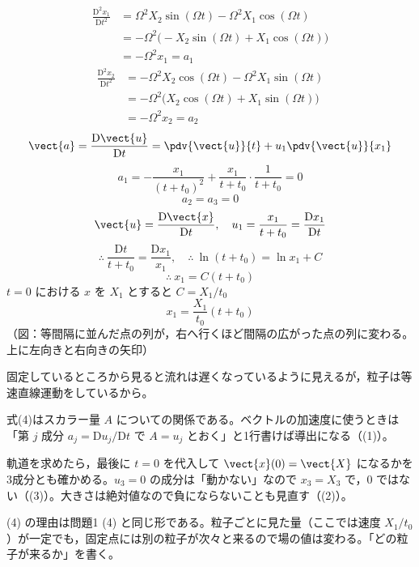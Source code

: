 \begin{align*}
\frac{\mathrm{D}^{2}x_{1}}{\mathrm{D}t^{2}}&=\Omega^{2}X_{2}\sin(\Omega t)-\Omega^{2}X_{1}\cos(\Omega t)\\
&=-\Omega^{2}\bigl(-X_{2}\sin(\Omega t)+X_{1}\cos(\Omega t)\bigr)\\
&=-\Omega^{2}x_{1}=a_{1}
\end{align*}
\begin{align*}
\frac{\mathrm{D}^{2}x_{2}}{\mathrm{D}t^{2}}&=-\Omega^{2}X_{2}\cos(\Omega t)-\Omega^{2}X_{1}\sin(\Omega t)\\
&=-\Omega^{2}\bigl(X_{2}\cos(\Omega t)+X_{1}\sin(\Omega t)\bigr)\\
&=-\Omega^{2}x_{2}=a_{2}
\end{align*}
\[ \vect{a}=\frac{\mathrm{D}\vect{u}}{\mathrm{D}t}=\pdv{\vect{u}}{t}+u_{1}\pdv{\vect{u}}{x_{1}} \]
\[ a_{1}=-\frac{x_{1}}{(t+t_{0})^{2}}+\frac{x_{1}}{t+t_{0}}\cdot\frac{1}{t+t_{0}}=0 \]
\[ a_{2}=a_{3}=0 \]
\[ \vect{u}=\frac{\mathrm{D}\vect{x}}{\mathrm{D}t},\quad u_{1}=\frac{x_{1}}{t+t_{0}}=\frac{\mathrm{D}x_{1}}{\mathrm{D}t} \]
\[ \therefore\ \frac{\mathrm{D}t}{t+t_{0}}=\frac{\mathrm{D}x_{1}}{x_{1}},\quad \therefore\ \ln(t+t_{0})=\ln x_{1}+C \]
\[ \therefore\ x_{1}=C(t+t_{0}) \]
$t=0$ における $x$ を $X_{1}$ とすると $C=X_{1}/t_{0}$
\[ x_{1}=\frac{X_{1}}{t_{0}}(t+t_{0}) \]
（図：等間隔に並んだ点の列が，右へ行くほど間隔の広がった点の列に変わる。上に左向きと右向きの矢印）

固定しているところから見ると流れは遅くなっているように見えるが，粒子は等速直線運動をしているから。
\item 式(4)はスカラー量 $A$ についての関係である。ベクトルの加速度に使うときは「第 $j$ 成分 $a_{j}=\mathrm{D}u_{j}/\mathrm{D}t$ で $A=u_{j}$ とおく」と1行書けば導出になる（(1)）。
\item 軌道を求めたら，最後に $t=0$ を代入して $\vect{x}(0)=\vect{X}$ になるかを3成分とも確かめる。$u_{3}=0$ の成分は「動かない」なので $x_{3}=X_{3}$ で，0 ではない（(3)）。大きさは絶対値なので負にならないことも見直す（(2)）。
\item (4) の理由は問題1 (4) と同じ形である。粒子ごとに見た量（ここでは速度 $X_{1}/t_{0}$）が一定でも，固定点には別の粒子が次々と来るので場の値は変わる。「どの粒子が来るか」を書く。
